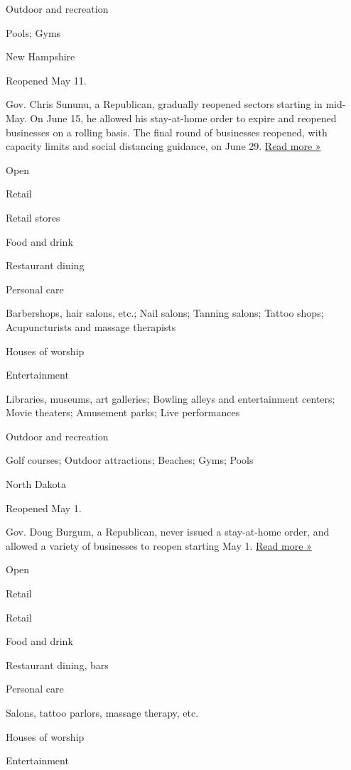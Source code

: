 Outdoor and recreation

Pools; Gyms

New Hampshire

Reopened May 11.

Gov. Chris Sununu, a Republican, gradually reopened sectors starting in
mid-May. On June 15, he allowed his stay-at-home order to expire and
reopened businesses on a rolling basis. The final round of businesses
reopened, with capacity limits and social distancing guidance, on June
29.
\href{https://www.unionleader.com/news/health/coronavirus/all-nh-businesses-now-have-date-to-reopen/article_558bfac2-5c67-5163-9fa3-7d7fcb426d9f.html}{Read
more »}

Open

Retail

Retail stores

Food and drink

Restaurant dining

Personal care

Barbershops, hair salons, etc.; Nail salons; Tanning salons; Tattoo
shops; Acupuncturists and massage therapists

Houses of worship

Entertainment

Libraries, museums, art galleries; Bowling alleys and entertainment
centers; Movie theaters; Amusement parks; Live performances

Outdoor and recreation

Golf courses; Outdoor attractions; Beaches; Gyms; Pools

North Dakota

Reopened May 1.

Gov. Doug Burgum, a Republican, never issued a stay-at-home order, and
allowed a variety of businesses to reopen starting May 1.
\href{https://bismarcktribune.com/news/local/health/task-force-created-as-burleigh-morton-blooms-into-coronavirus-hot-spot/article_65d08b69-223c-5d79-bafe-05352f3d12bd.html}{Read
more »}

Open

Retail

Retail

Food and drink

Restaurant dining, bars

Personal care

Salons, tattoo parlors, massage therapy, etc.

Houses of worship

Entertainment

